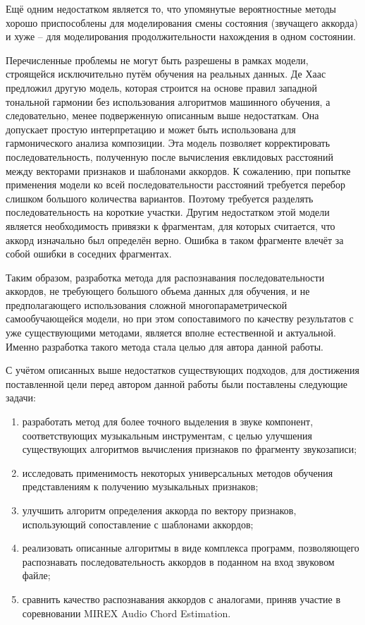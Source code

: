 Ещё одним недостатком является то, что упомянутые вероятностные методы хорошо
приспособлены для моделирования смены состояния (звучащего аккорда) и хуже --
для моделирования продолжительности нахождения в одном состоянии.

Перечисленные проблемы не могут быть разрешены в рамках модели, строящейся
исключительно путём обучения на реальных данных. Де Хаас предложил другую
модель, которая строится на основе правил западной тональной гармонии без
использования алгоритмов машинного обучения, а следовательно, менее подверженную
описанным выше недостаткам. Она допускает простую интерпретацию и может быть
использована для гармонического анализа композиции. Эта модель позволяет
корректировать последовательность, полученную после вычисления евклидовых
расстояний между векторами признаков и шаблонами аккордов. К сожалению, при
попытке применения модели ко всей последовательности расстояний требуется
перебор слишком большого количества вариантов. Поэтому требуется разделять
последовательность на короткие участки. Другим недостатком этой модели является
необходимость привязки к фрагментам, для которых считается, что аккорд
изначально был определён верно. Ошибка в таком фрагменте влечёт за собой ошибки
в соседних фрагментах.

Таким образом, разработка метода для распознавания последовательности аккордов,
не требующего большого объема данных для обучения, и не предполагающего
использования сложной многопараметрической самообучающейся модели, но при этом
сопоставимого по качеству результатов с уже существующими методами, является
вполне естественной и актуальной. Именно разработка такого метода стала целью
для автора данной работы.

С учётом описанных выше недостатков существующих подходов, для достижения
поставленной цели перед автором данной работы были поставлены следующие
задачи:

\begin{enumerate}
  \item разработать метод для более точного выделения в звуке компонент,
  соответствующих музыкальным инструментам, с целью улучшения существующих
  алгоритмов вычисления признаков по фрагменту звукозаписи;
  \item исследовать применимость некоторых универсальных методов обучения
  представлениям к получению музыкальных признаков;
  \item улучшить алгоритм определения аккорда по вектору признаков,
  использующий сопоставление с шаблонами аккордов;
  \item реализовать описанные алгоритмы в виде комплекса программ, позволяющего
  распознавать последовательность аккордов в поданном на вход звуковом файле;
  \item сравнить качество распознавания аккордов с аналогами, приняв участие в
  соревновании MIREX Audio Chord Estimation.
\end{enumerate}

